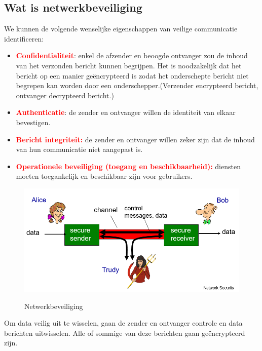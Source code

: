 \subsection{Wat is netwerkbeveiliging}
We kunnen de volgende wenselijke eigenschappen van veilige communicatie identificeren:
\begin{itemize}
    \item \textcolor{red}{\textbf{Confidentialiteit}}: enkel de afzender en beoogde ontvanger zou de inhoud van het verzonden bericht kunnen begrijpen. Het is noodzakelijk dat het bericht op een manier geëncrypteerd is zodat het onderschepte bericht niet begrepen kan worden door een onderschepper.(Verzender encrypteerd bericht, ontvanger decrypteerd bericht.)
    \item \textcolor{red}{\textbf{Authenticatie}}: de zender en ontvanger willen de identiteit van elkaar bevestigen.
    \item \textcolor{red}{\textbf{Bericht integriteit:}} de zender en ontvanger willen zeker zijn dat de inhoud van hun communicatie niet aangepast is.
    \item \textcolor{red}{\textbf{Operationele beveiliging (toegang en beschikbaarheid):}} diensten moeten toegankelijk en beschikbaar zijn voor gebruikers.
\end{itemize}

\begin{figure}[h]
    \centering
    \includegraphics[width=7in]{./img/imghfdst8/hfdst8puntje1.png}\\[1cm]
    \caption{Netwerkbeveiliging }      
    \label{fig:Netwerkbeveiliging }
\end{figure}
\noindent Om data veilig uit te wisselen, gaan de zender en ontvanger controle en data berichten uitwisselen. Alle of sommige van deze berichten gaan geëncrypteerd zijn. 

